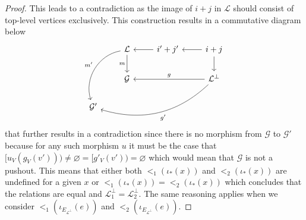 \begin{proof}
    This leads to a contradiction as the image of $i + j$ in $\mathcal{L}$ should consist of top-level vertices exclusively.
    This construction results in a commutative diagram below
    \[
        \begin{tikzcd}
            & \mathcal{L} \arrow[d, "m"'] \arrow[ldd, "m'"', bend right=49] & i'+j' \arrow[l] & i+j \arrow[d] \arrow[l]                                           \\
            & \mathcal{G}                                                   &                 & \mathcal{L}^{\bot} \arrow[ll, "g"'] \arrow[llld, "g'", bend left] \\
\mathcal{G}' &                                                               &                 &                                                                  
\end{tikzcd}
    \]
    that further results in a contradiction since there is no morphism from $\mathcal{G}$ to $\mathcal{G'}$ because for any such morphism $u$ it must be the case that $[u_{V}(g_{V}(v'))) \not = \varnothing = [g'_{V}(v')) = \varnothing$ which would mean that $\mathcal{G}$ is not a pushout.
    This means that either both $<_{1}(\iota_{*}(x))$ and $<_{2}(\iota_{*}(x))$ are undefined for a given $x$ or $<_{1}(\iota_{*}(x)) = <_{2}(\iota_{*}(x))$ which concludes that the relations are equal and $\mathcal{L}_{1}^{\bot} = \mathcal{L}_{2}^{\bot}$.
    The same reasoning applies when we consider $<_{1}(\iota_{E_{\mathcal{L}^{\bot}}}(e))$ and $<_{2}(\iota_{E_{\mathcal{L}^{\bot}}}(e))$.


\end{proof}
